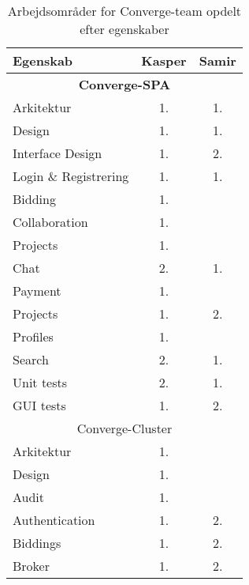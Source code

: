\begin{table}[H]
  \centering
  \caption{Arbejdsområder for Converge-team opdelt efter egenskaber}
  \label{tab:distribution-of-work}
  \begin{tabular}{lcc}
    \hline
    \textbf{Egenskab}      & \textbf{Kasper} & \textbf{Samir} \\ \hline
    \multicolumn{3}{c}{\textbf{Converge-SPA}}                 \\ \hline
    Arkitektur             & 1.              & 1.             \\
    Design                 & 1.              & 1.             \\
    Interface Design       & 1.              & 2.             \\
    Login \& Registrering  & 1.              & 1.               \\
    Bidding                & 1.              &                \\
    Collaboration          & 1.              &                \\
    Projects               & 1.              &                \\
    Chat                   & 2.              & 1.             \\
    Payment                & 1.              &                \\
    Projects               & 1.              & 2.             \\
    Profiles               & 1.              &                \\
    Search                 & 2.              & 1.             \\
    Unit tests             & 2.              & 1.             \\
    GUI tests              & 1.              & 2.             \\ \hline
    \multicolumn{3}{c}{Converge-Cluster}                      \\ \hline
    Arkitektur             & 1.              &                \\
    Design                 & 1.              &                \\
    Audit                  & 1.              &                \\
    Authentication         & 1.              & 2.             \\
    Biddings               & 1.              & 2.             \\
    Broker                 & 1.              & 2.             \\

\end{tabular}
\end{table}
